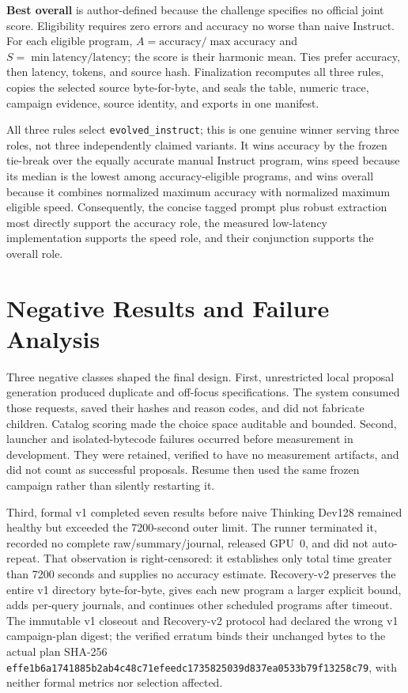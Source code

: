 \documentclass{article}
\begin{document}
\textbf{Best overall} is author-defined because the challenge specifies no official
joint score. Eligibility requires zero errors and accuracy no worse than naive
Instruct. For each eligible program,
$A=\mathrm{accuracy}/\max \mathrm{accuracy}$ and
$S=\min \mathrm{latency}/\mathrm{latency}$; the score is their harmonic mean.
Ties prefer accuracy, then latency, tokens, and source hash. Finalization
recomputes all three rules, copies the selected source byte-for-byte, and seals
the table, numeric trace, campaign evidence, source identity, and exports in one
manifest.

All three rules select \texttt{evolved\_instruct}; this is one genuine winner
serving three roles, not three independently claimed variants. It wins accuracy
by the frozen tie-break over the equally accurate manual Instruct program, wins
speed because its median is the lowest among accuracy-eligible programs, and wins
overall because it combines normalized maximum accuracy with normalized maximum
eligible speed. Consequently, the concise tagged prompt plus robust extraction
most directly support the accuracy role, the measured low-latency implementation
supports the speed role, and their conjunction supports the overall role.

\section{Negative Results and Failure Analysis}
Three negative classes shaped the final design. First, unrestricted local
proposal generation produced duplicate and off-focus specifications. The system
consumed those requests, saved their hashes and reason codes, and did not fabricate
children. Catalog scoring made the choice space auditable and bounded. Second,
launcher and isolated-bytecode failures occurred before measurement in development.
They were retained, verified to have no measurement artifacts, and did not count
as successful proposals. Resume then used the same frozen campaign rather than
silently restarting it.

Third, formal v1 completed seven results before naive Thinking Dev128 remained
healthy but exceeded the 7200-second outer limit. The runner terminated it,
recorded no complete raw/summary/journal, released GPU~0, and did not auto-repeat.
That observation is right-censored: it establishes only total time greater than
7200 seconds and supplies no accuracy estimate. Recovery-v2 preserves the entire
v1 directory byte-for-byte, gives each new program a larger explicit bound, adds
per-query journals, and continues other scheduled programs after timeout.
The immutable v1 closeout and Recovery-v2 protocol had declared the wrong v1
campaign-plan digest; the verified erratum binds their unchanged bytes to the
actual plan SHA-256 \texttt{effe1b6a1741885b2ab4c48c71efeedc1735825039d837ea0533b79f13258c79},
with neither formal metrics nor selection affected.
\end{document}
